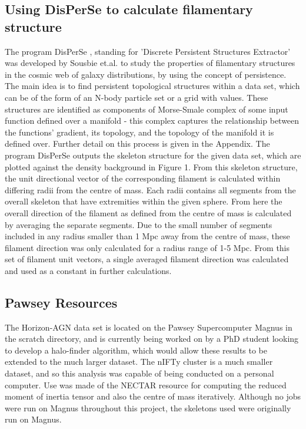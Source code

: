 \documentclass[journal]{IEEEtran}
\begin{document}
\subsection{Using DisPerSe to calculate filamentary structure}
The program DisPerSe \cite{sousbie11a}, standing for 'Discrete Persistent Structures Extractor' was developed by Sousbie et.al. to study the properties of filamentary structures in the cosmic web of galaxy distributions, by using the concept of persistence. The main idea is to find persistent topological structures within a data set, which can be of the form of an N-body particle set or a grid with values. These structures are identified as components of Morse-Smale complex of some input function defined over a manifold - this complex captures the relationship between the functions' gradient, its topology, and the topology of the manifold it is defined over. Further detail on this process is given in the Appendix.
The program DisPerSe outputs the skeleton structure for the given data set, which are plotted against the density background in Figure 1. From this skeleton structure, the unit directional vector of the corresponding filament is calculated within differing radii from the centre of mass. Each radii contains all segments from the overall skeleton that have extremities within the given sphere. From here the overall direction of the filament as defined from the centre of mass is calculated by averaging the separate segments. Due to the small number of segments included in any radius smaller than 1 Mpc away from the centre of mass, these filament direction was only calculated for a radius range of 1-5 Mpc. From this set of filament unit vectors, a single averaged filament direction was calculated and used as a constant in further calculations.

\subsection{Pawsey Resources}
The Horizon-AGN data set is located on the Pawsey Supercomputer Magnus in the scratch directory, and is currently being worked on by a PhD student looking to develop a halo-finder algorithm, which would allow these results to be extended to the much larger dataset. The nIFTy cluster is a much smaller dataset, and so this analysis was capable of being conducted on a personal computer. Use was made of the NECTAR resource for computing the reduced moment of inertia tensor and also the centre of mass iteratively. Although no jobs were run on Magnus throughout this project, the skeletons used were originally run on Magnus. 
\end{document}
